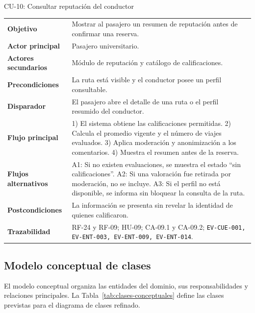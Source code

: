 \documentclass[12pt,a4paper]{article}
\newcommand{\CampoCU}[2]{\textbf{#1} & #2\\}
\begin{document}
\begin{CUBox}{CU-10: Consultar reputación del conductor}
\small
\begin{tabularx}{\linewidth}{@{}L{3.20cm}Y@{}}
\CampoCU{Objetivo}{Mostrar al pasajero un resumen de reputación antes de confirmar una reserva.}
\CampoCU{Actor principal}{Pasajero universitario.}
\CampoCU{Actores secundarios}{Módulo de reputación y catálogo de calificaciones.}
\CampoCU{Precondiciones}{La ruta está visible y el conductor posee un perfil consultable.}
\CampoCU{Disparador}{El pasajero abre el detalle de una ruta o el perfil resumido del conductor.}
\CampoCU{Flujo principal}{1) El sistema obtiene las calificaciones permitidas. 2) Calcula el promedio vigente y el número de viajes evaluados. 3) Aplica moderación y anonimización a los comentarios. 4) Muestra el resumen antes de la reserva.}
\CampoCU{Flujos alternativos}{A1: Si no existen evaluaciones, se muestra el estado ``sin calificaciones''. A2: Si una valoración fue retirada por moderación, no se incluye. A3: Si el perfil no está disponible, se informa sin bloquear la consulta de la ruta.}
\CampoCU{Postcondiciones}{La información se presenta sin revelar la identidad de quienes calificaron.}
\CampoCU{Trazabilidad}{RF-24 y RF-09; HU-09; CA-09.1 y CA-09.2; \texttt{EV-CUE-001, EV-ENT-003, EV-ENT-009, EV-ENT-014}.}
\end{tabularx}
\end{CUBox}

\subsection{Modelo conceptual de clases}

El modelo conceptual organiza las entidades del dominio, sus responsabilidades y relaciones principales. La Tabla~\ref{tab:clases-conceptuales} define las clases previstas para el diagrama de clases refinado.
\end{document}
